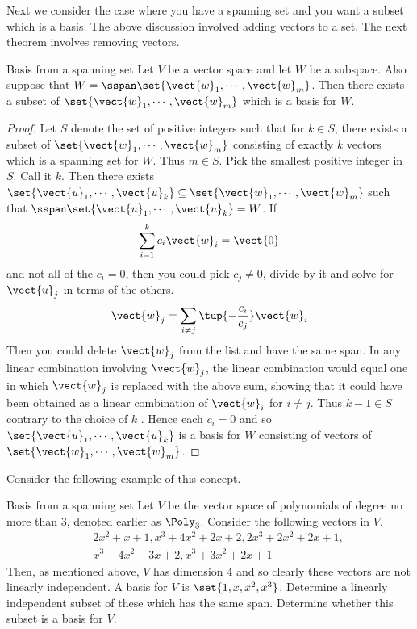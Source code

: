 Next we consider the case where you have a
spanning set and you want a subset which is a basis. The above discussion involved adding vectors to a set. The next theorem involves removing vectors. 

\begin{theorem}{Basis from a spanning set}{}
Let $V$ be a vector space and let $W$ be a subspace. Also
suppose that $W=\sspan\set{\vect{w}_{1},\cdots ,\vect{w}
_{m}}$. Then there exists a subset of $\set{\vect{w}_{1},\cdots ,
\vect{w}_{m}} $ which is a basis for $W$.
\end{theorem}

\begin{proof}
Let $S$ denote the set of positive integers such that for $
k\in S$, there exists a subset of $\set{\vect{w}_{1},\cdots ,\vect{w}
_{m}} $ consisting of exactly $k$ vectors which is a spanning set for 
$W$. Thus $m\in S$. Pick the smallest positive integer in $S$. Call it $k$.
Then there exists $\set{\vect{u}_{1},\cdots ,\vect{u}_{k}} \subseteq
\set{\vect{w}_{1},\cdots ,\vect{w}_{m}} $ such that $\sspan
\set{\vect{u}_{1},\cdots ,\vect{u}_{k}} =W$. If 
\begin{equation*}
\sum_{i=1}^{k}c_{i}\vect{w}_{i}=\vect{0}
\end{equation*}
and not all of the $c_{i}=0$, then you could pick $c_{j}\neq 0$, divide by
it and solve for $\vect{u}_{j}$ in terms of the others. 
\begin{equation*}
\vect{w}_{j}=\sum_{i\neq j}\tup{-\frac{c_{i}}{c_{j}}} \vect{w}_{i}
\end{equation*}
Then you could delete $\vect{w}_{j}$ from the list and have the same span.
In any linear combination involving $\vect{w}_{j}$, the linear
combination would equal one in which $\vect{w}_{j}$ is replaced with the
above sum, showing that it could have been obtained as a linear combination
of $\vect{w}_{i}$ for $i\neq j$. Thus $k-1\in S$ contrary to the choice of $k$
. Hence each $c_{i}=0$ and so $\set{\vect{u}_{1},\cdots ,\vect{u}
_{k}} $ is a basis for $W$ consisting of vectors of $\set{\vect{w}
_{1},\cdots ,\vect{w}_{m}}$. 
\end{proof}

Consider the following example of this concept. 

\begin{example}{Basis from a spanning set}{}
Let $V$ be the vector space of polynomials of degree no more than 3,
denoted earlier as $\Poly_{3}$. Consider the following vectors in $V$.
\begin{eqnarray*}
&&2x^{2}+x+1,x^{3}+4x^{2}+2x+2,2x^{3}+2x^{2}+2x+1, \\
&&x^{3}+4x^{2}-3x+2,x^{3}+3x^{2}+2x+1
\end{eqnarray*}
Then, as mentioned above, $V$ has dimension 4 and so clearly these vectors
are not linearly independent. A basis for $V$ is $\set{
1,x,x^{2},x^{3}}$. Determine a linearly independent subset of these
which has the same span. Determine whether this subset is a basis for $V$.
\end{example}

